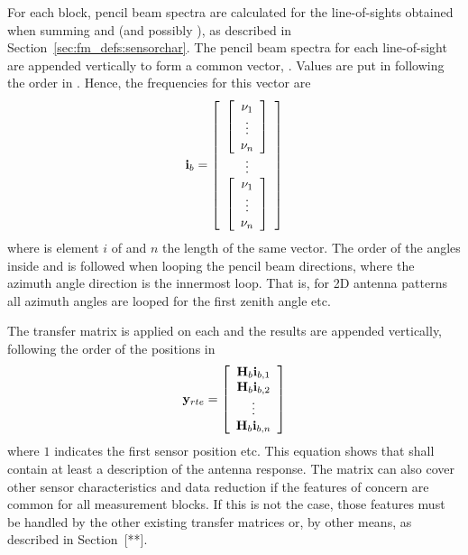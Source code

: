 For each block, pencil beam spectra are calculated for the
line-of-sights obtained when summing  and
 (and possibly
), as described in
Section~\ref{sec:fm_defs:sensorchar}. The pencil beam spectra for each
line-of-sight are appended vertically to form a common vector,
. Values are put in following the order in
. Hence, the frequencies for this vector are
\begin{equation}
  \mathbf{i}_{b} = 
  \left[ \begin{array}{c} 
     \left[
          \begin{array}{c} \nu_{1}\\\vdots\\\nu_{n} \end{array} 
     \right] \\
     \vdots \\
     \left[
          \begin{array}{c} \nu_{1}\\\vdots\\\nu_{n} \end{array} 
     \right]
     \end{array} \right]
  \label{eq:fm_defs:freqs_of_ib}
\end{equation}
where  is element $i$ of  and $n$ the length of
the same vector. The order of the angles inside 
and  is followed when looping the pencil beam
directions, where the azimuth angle direction is the innermost loop.
That is, for 2D antenna patterns all azimuth angles are looped for the
first zenith angle etc. 

The transfer matrix  is applied on each  and the
results are appended vertically, following the order of the positions
in 
\begin{equation}
  \mathbf{y}_{rte} = \left[ \begin{array}{c} \mathbf{H}_{b}\mathbf{i}_{{b,1}} \\ 
                                    \mathbf{H}_{b}\mathbf{i}_{{b,2}} \\
                                    \vdots                     \\
                                    \mathbf{H}_{b}\mathbf{i}_{{b,n}} 
            \end{array} \right]
  \label{eq:fm_defs:measseq}
\end{equation}
where $1$ indicates the first sensor position etc. This equation shows
that  shall contain at least a description of the antenna
response. The matrix  can also cover other sensor
characteristics and data reduction if the features of concern are
common for all measurement blocks. If this is not the case, those
features must be handled by the other existing transfer matrices or,
by other means, as described in Section~[**].

